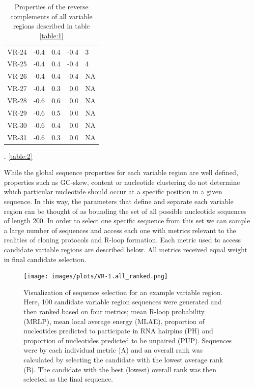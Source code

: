 \documentclass[11pt]{article}
\begin{document}
\begin{table}
\begin{tabular}{lrrrl}
	VR-24 &     -0.4 &         0.4 &     -0.4 &              3 \\
	VR-25 &     -0.4 &         0.4 &     -0.4 &              4 \\
	VR-26 &     -0.4 &         0.4 &     -0.4 &             NA \\
	VR-27 &     -0.4 &         0.3 &      0.0 &             NA \\
	VR-28 &     -0.6 &         0.6 &      0.0 &             NA \\
	VR-29 &     -0.6 &         0.5 &      0.0 &             NA \\
	VR-30 &     -0.6 &         0.4 &      0.0 &             NA \\
	VR-31 &     -0.6 &         0.3 &      0.0 &             NA \\
	\bottomrule
	
\end{tabular}
\caption{Properties of the reverse complements of all variable regions described in table \ref{table:1}}.
\ref{table:2}
\end{table}

While the global sequence properties for each variable region are well defined, properties such as GC-skew, content or nucleotide clustering do not determine which particular nucleotide should occur at a specific position in a given sequence. In this way, the parameters that define and separate each variable region can be thought of as bounding the set of all possible nucleotide sequences of length 200. In order to select one specific sequence from this set we can sample a large number of sequences and access each one with metrics relevant to the realities of cloning protocols and R-loop formation. Each metric used to access candidate variable regions are described below. All metrics received equal weight in final candidate selection. 

\begin{figure}[H]
	\texttt{[image: images/plots/VR-1.all\_ranked.png]}
	\centering
	\caption{Visualization of sequence selection for an example variable region. Here, 100 candidate variable region sequences were generated and then ranked based on four metrics; mean R-loop probability (MRLP), mean local average energy (MLAE), proportion of nucleotides predicted to participate in RNA hairpins (PH) and proportion of nucleotides predicted to be unpaired (PUP). Sequences were by each individual metric (A) and an overall rank was calculated by selecting the candidate with the lowest average rank (B). The candidate with the best (lowest) overall rank was then selected as the final sequence.}
	\label{ranking}
\end{figure}
\end{document}
